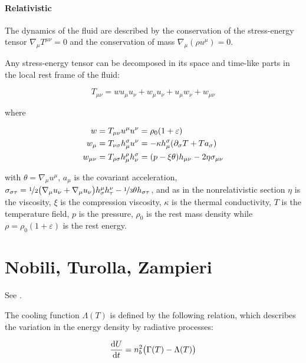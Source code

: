 \documentclass[main.tex]{subfiles}
\begin{document}
\paragraph{Relativistic}

The dynamics of the fluid are described by the conservation of the stress-energy tensor \(\nabla_\mu T ^{\mu \nu} =0\) and the conservation of mass \(\nabla_\mu (\rho u^\mu) =0\).

Any stress-energy tensor can be decomposed in its space and time-like parts in the local rest frame of the fluid:

\begin{equation}
    T_{\mu \nu} = w u_\mu u_\nu + w_\mu u_\nu + u_\mu w_\nu + w _{\mu \nu}
\end{equation}

where

\begin{subequations}
\begin{align}
  w &=  T _{\mu \nu} u^\mu u^\nu = \rho_0 (1 + \varepsilon) \\
  w_\mu &= T _{\nu \sigma} h^\sigma _\mu u^\nu  = -\kappa h_\mu ^\sigma  \qty(\partial_\sigma T + T a_\sigma)\\
  w_{\mu \nu} &= T_{\rho \sigma} h^\rho _\mu h^\sigma_\nu = \qty(p - \xi \theta) h_{\mu \nu} - 2 \eta \sigma_{\mu \nu}
\end{align}
\end{subequations}

with \(\theta = \nabla_\mu u^\mu\), \(a_\mu\) is the covariant acceleration, \(\sigma_{\sigma \tau} = \frac[i]{1}{2} \qty(\nabla_\mu u_\nu + \nabla_\mu u_\nu) h^\mu_\sigma h^\nu _\tau - \frac[i]{1}{3} \theta h_{\sigma \tau}\),
and as in the nonrelativistic section \(\eta\) is the viscosity, \(\xi\) is the compression viscosity,  \(\kappa\) is the thermal conductivity, \(T\) is the temperature field, \(p\) is the pressure, \(\rho_0\) is the rest mass density while \(\rho = \rho_0 (1 + \varepsilon)\) is the rest energy.

\section{Nobili, Turolla, Zampieri}

See \cite{NobiliTurollaZampieri:1991dec}.

The cooling function \(\Lambda (T)\) is defined by the following relation, which describes the variation in the energy density by radiative processes:

\begin{equation}
    \dv{U}{t} = n^2_b \qty(\Gamma(T) - \Lambda (T))
\end{equation}
\end{document}
